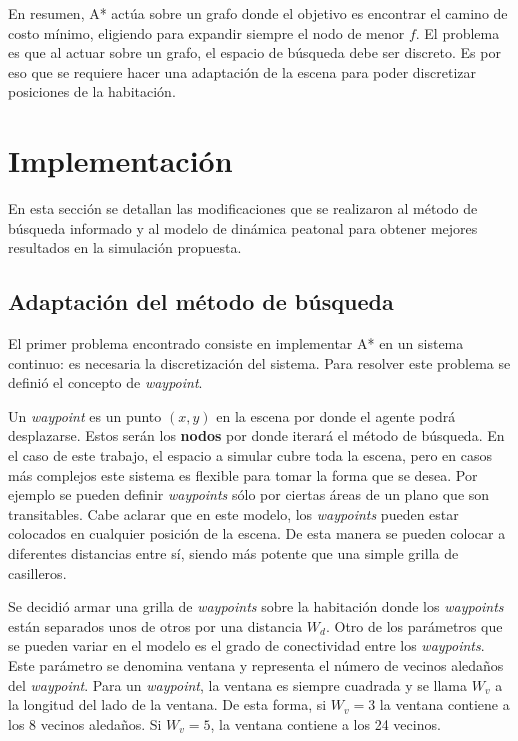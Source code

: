 \documentclass[a4paper,10pt]{article}
\begin{document}
En resumen, A* actúa sobre un grafo donde el objetivo es encontrar el camino de costo mínimo, eligiendo para expandir siempre el nodo de menor $f$. El problema es que al actuar sobre un grafo, el espacio de búsqueda debe ser discreto. Es por eso que se requiere hacer una adaptación de la escena para poder discretizar posiciones de la habitación.

\section{Implementación}

En esta sección se detallan las modificaciones que se realizaron al método de búsqueda informado y al modelo de dinámica peatonal para obtener mejores resultados en la simulación propuesta.

\subsection{Adaptación del método de búsqueda}

El primer problema encontrado consiste en implementar A* en un sistema continuo: es necesaria la discretización del sistema. Para resolver este problema se definió el concepto de \textit{waypoint}.

Un \textit{waypoint} es un punto $(x,y)$ en la escena por donde el agente podrá desplazarse. Estos serán los \textbf{nodos} por donde iterará el método de búsqueda. En el caso de este trabajo, el espacio a simular cubre toda la escena, pero en casos más complejos este sistema es flexible para tomar la forma que se desea. Por ejemplo se pueden definir \textit{waypoints} sólo por ciertas áreas de un plano que son transitables. Cabe aclarar que en este modelo, los \textit{waypoints} pueden estar colocados en cualquier posición de la escena. De esta manera se pueden colocar a diferentes distancias entre sí, siendo más potente que una simple grilla de casilleros.

Se decidió armar una grilla de \textit{waypoints} sobre la habitación donde  los \textit{waypoints} están separados unos de otros por una distancia $W_{d}$. Otro de los parámetros que se pueden variar en el modelo es el grado de conectividad entre los \textit{waypoints}. Este parámetro se denomina ventana y representa el número de vecinos aledaños del \textit{waypoint}. Para un \textit{waypoint}, la ventana es siempre cuadrada y se llama $W_{v}$ a la longitud del lado de la ventana. De esta forma, si $W_{v} = 3$ la ventana contiene a los 8 vecinos aledaños. Si $W_{v} = 5$, la ventana contiene a los 24 vecinos. 
\end{document}
